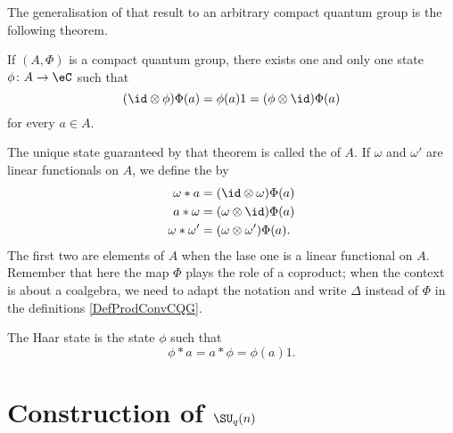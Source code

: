 The generalisation of that result to an arbitrary compact quantum group is the following theorem.
\begin{theorem}
    If $(A,\Phi)$ is a compact quantum group, there exists one and only one state $\phi\colon A\to \eC$ such that
    \begin{equation}
        (\id\otimes\phi)\Phi(a)=\phi(a)1=(\phi\otimes\id)\Phi(a)
    \end{equation}
    for every $a\in A$.
\end{theorem}
The unique state guaranteed by that theorem is called the  of $A$. If $\omega$ and $\omega'$ are linear functionals on $A$, we define the  by
\begin{equation}        \label{DefProdConvCQG}
    \begin{aligned}[]
        \omega * a&=(\id\otimes\omega)\Phi(a)\\
        a*\omega &=(\omega\otimes\id)\Phi(a)\\
        \omega * \omega'&=(\omega\otimes\omega')\Phi(a).
    \end{aligned}
\end{equation}
The first two are elements of $A$ when the lase one is a linear functional on $A$. Remember that here the map $\Phi$ plays the role of a coproduct; when the context is about a coalgebra, we need to adapt the notation and write $\Delta$ instead of $\Phi$ in the definitions \ref{DefProdConvCQG}.

The Haar state is the state $\phi$ such that
\begin{equation}
    \phi*a=a*\phi=\phi(a)1.
\end{equation}


\section{Construction of \texorpdfstring{$\SU_q(n)$}{SUqn}}
\label{SecGeneratorsonSUQn}

